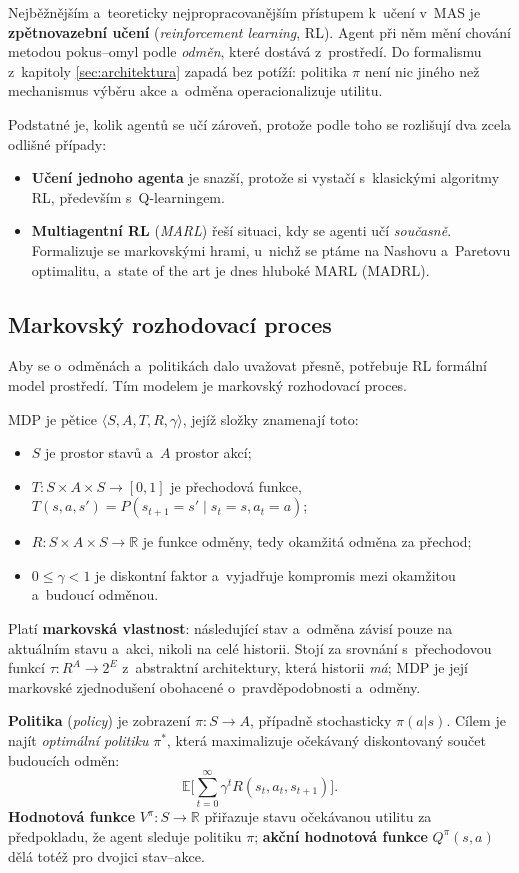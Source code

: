 \documentclass[11pt,a4paper]{article}
\theoremstyle{definition}
\begin{document}
Nejběžnějším a~teoreticky nejpropracovanějším přístupem k~učení v~MAS je \textbf{zpětnovazební
učení} (\emph{reinforcement learning}, RL). Agent při něm mění chování metodou pokus--omyl
podle \emph{odměn}, které dostává z~prostředí. Do formalismu z~kapitoly \ref{sec:architektura}
zapadá bez potíží: politika $\pi$ není nic jiného než mechanismus výběru akce a~odměna
operacionalizuje utilitu.

Podstatné je, kolik agentů se učí zároveň, protože podle toho se rozlišují dva zcela odlišné
případy:
\begin{itemize}
\item \textbf{Učení jednoho agenta} je snazší, protože si vystačí s~klasickými algoritmy RL,
  především s~Q-learningem.
\item \textbf{Multiagentní RL} (\emph{MARL}) řeší situaci, kdy se agenti učí \emph{současně}.
  Formalizuje se markovskými hrami, u~nichž se ptáme na Nashovu a~Paretovu optimalitu, a~state
  of the art je dnes hluboké MARL (MADRL).
\end{itemize}

\subsection{Markovský rozhodovací proces}

Aby se o~odměnách a~politikách dalo uvažovat přesně, potřebuje RL formální model prostředí.
Tím modelem je markovský rozhodovací proces.

\begin{defbox}
MDP je pětice $\langle S, A, T, R, \gamma\rangle$, jejíž složky znamenají toto:
\begin{itemize}
\item $S$ je prostor stavů a~$A$ prostor akcí;
\item $T : S \times A \times S \to [0,1]$ je přechodová funkce,
  $T(s,a,s') = P(s_{t+1}=s' \mid s_t=s, a_t=a)$;
\item $R : S \times A \times S \to \mathbb{R}$ je funkce odměny, tedy okamžitá odměna
  za přechod;
\item $0 \le \gamma < 1$ je diskontní faktor a~vyjadřuje kompromis mezi okamžitou a~budoucí
  odměnou.
\end{itemize}
Platí \textbf{markovská vlastnost}: následující stav a~odměna závisí pouze na aktuálním stavu
a~akci, nikoli na celé historii. Stojí za srovnání s~přechodovou funkcí $\tau : R^A \to 2^E$
z~abstraktní architektury, která historii \emph{má}; MDP je její markovské zjednodušení
obohacené o~pravděpodobnosti a~odměny.

\textbf{Politika} (\emph{policy}) je zobrazení $\pi : S \to A$, případně stochasticky
$\pi(a|s)$. Cílem je najít \emph{optimální politiku} $\pi^*$, která maximalizuje očekávaný
diskontovaný součet budoucích odměn:
\[
\mathbb{E}\Big[ \sum_{t=0}^{\infty} \gamma^t R(s_t, a_t, s_{t+1}) \Big].
\]
\textbf{Hodnotová funkce} $V^\pi : S \to \mathbb{R}$ přiřazuje stavu očekávanou utilitu za
předpokladu, že agent sleduje politiku $\pi$; \textbf{akční hodnotová funkce} $Q^\pi(s,a)$
dělá totéž pro dvojici stav--akce.
\end{defbox}
\end{document}
